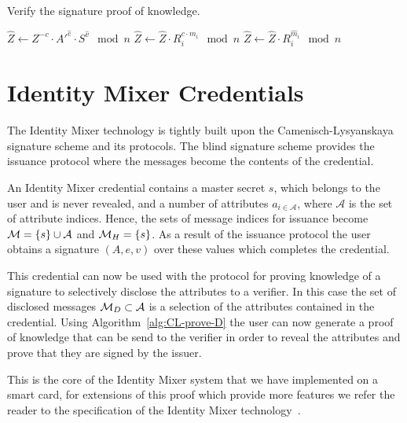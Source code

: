 \begin{algorithm}
  \caption{Verify the signature proof of knowledge.}
  \label{alg:CL-verify-D}
  \addtolength{\baselineskip}{1.5mm}

  \begin{algorithmic}[1]
      \State $\hat{Z} \gets Z^{-c} \cdot A'^{\hat{e}} \cdot S^{\hat{v}} \mod n$
        \State $\hat{Z} \gets \hat{Z} \cdot R_i^{c \cdot m_i} \mod n$
      \EndFor
        \State $\hat{Z} \gets \hat{Z} \cdot R_i^{\hat{m}_i} \mod n$
      \EndFor

        \Return {}
      \EndIf
      \Return {}
    \EndFunction
  \end{algorithmic}
\end{algorithm}

\section{Identity Mixer Credentials}

The Identity Mixer technology is tightly built upon the Camenisch-Lysyanskaya
signature scheme and its protocols. The blind signature scheme provides the
issuance protocol where the messages become the contents of the credential.

An Identity Mixer credential contains a master secret $s$, which belongs to the
user and is never revealed, and a number of attributes $a_{i \in \mathcal{A}}$,
where $\mathcal{A}$ is the set of attribute indices. Hence, the sets of message
indices for issuance become $\mathcal{M} = \{s\} \cup \mathcal{A}$ and $\mathcal{M}_H = \{s\}$.
As a result of the issuance protocol the user obtains a signature $(A, e, v)$
over these values which completes the credential.

This credential can now be used with the protocol for proving knowledge of a
signature to selectively disclose the attributes to a verifier. In this case the
set of disclosed messages $\mathcal{M}_D \subset \mathcal{A}$ is a selection of the
attributes contained in the credential. Using Algorithm~\ref{alg:CL-prove-D} the
user can now generate a proof of knowledge that can be send to the verifier in
order to reveal the attributes and prove that they are signed by the issuer.

This is the core of the Identity Mixer system that we have implemented on a
smart card, for extensions of this proof which provide more features we refer
the reader to the specification of the Identity Mixer
technology~\cite{IdemixCrypto2012}.

